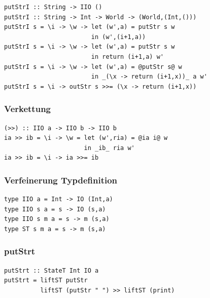 			\lstHaskell
			\begin{lstlisting}
putStrI :: String -> IIO ()
putStrI :: String -> Int -> World -> (World,(Int,()))
putStrI s = \i -> \w -> let (w',a) = putStr s w
                        in (w',(i+1,a))
putStrI s = \i -> \w -> let (w',a) = putStr s w
                        in return (i+1,a) w'
putStrI s = \i -> \w -> let (w',a) = @putStr s@ w
                        in _(\x -> return (i+1,x))_ a w'
putStrI s = \i -> outStr s >>= (\x -> return (i+1,x))
			\end{lstlisting}


		\subsubsection{Verkettung} %
		\label{ssub:verkettung}
		
			\lstHaskell
			\begin{lstlisting}
(>>) :: IIO a -> IIO b -> IIO b
ia >> ib = \i -> \w = let (w',ria) = @ia i@ w
                      in _ib_ ria w'
ia >> ib = \i -> ia >>= ib
			\end{lstlisting}


		\subsubsection{Verfeinerung Typdefinition} %
		\label{ssub:verfeinerung_typdefinition}
		
			\lstHaskell
			\begin{lstlisting}
type IIO a = Int -> IO (Int,a)
type IIO s a = s -> IO (s,a)
type IIO s m a = s -> m (s,a)
type ST s m a = s -> m (s,a)
			\end{lstlisting}


		\subsubsection{putStrt} %
		\label{ssub:putstrt}
		
			\lstHaskell
			\begin{lstlisting}
putStrt :: StateT Int IO a
putStrt = liftST putStr
          liftST (putStr " ") >> liftST (print)
			\end{lstlisting}

